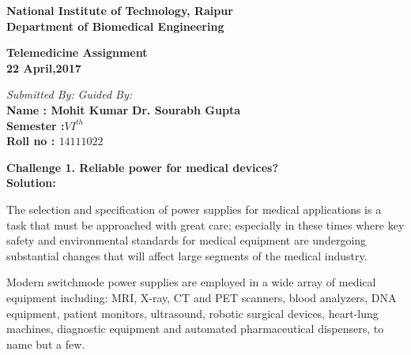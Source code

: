 \documentclass[12]{article}
\begin{document}
	\begin{center}
		\begin{Large}
			\textbf{National Institute of Technology, Raipur}\\
			\bigskip
			\textbf{Department of Biomedical Engineering }\\
		\end{Large}
	\end{center}
		\begin{Large}
			\begin{center}
				\textbf{Telemedicine Assignment} \\
				\bigskip
				\textbf{22 April,2017}
			\end{center}
		\end{Large}
		\vspace{5cm}
		 
		\begin{Large}
			\begin{flushleft}
				\textit{Submitted By:}  \hspace{10.2cm} \textit{Guided By:}\\
				\textbf{Name : Mohit Kumar}  \hspace{5.4cm} \textbf{Dr. Sourabh Gupta}\\
				\textbf{Semester :$VI^{th}$}  \hspace{9cm} \\
				\textbf{Roll no : $14111022$ }  
		
			\end{flushleft} 
				\end{Large}
				\newpage
	
		\begin{flushleft}
		\textbf{Challenge 1. Reliable power for medical devices?}\\
		\textbf{Solution:}	
		\end{flushleft}
		 The selection and specification of power supplies for medical applications is a task that must be approached with great care; especially in these times where key safety and environmental standards for medical equipment are undergoing substantial changes that will affect large segments of the medical industry.
		 
		 Modern switchmode power supplies are employed in a wide array of medical equipment including: MRI, X-ray, CT and PET scanners, blood analyzers, DNA equipment, patient monitors, ultrasound, robotic surgical devices, heart-lung machines, diagnostic equipment and automated pharmaceutical dispensers, to name but a few. 
		 
\end{document}
